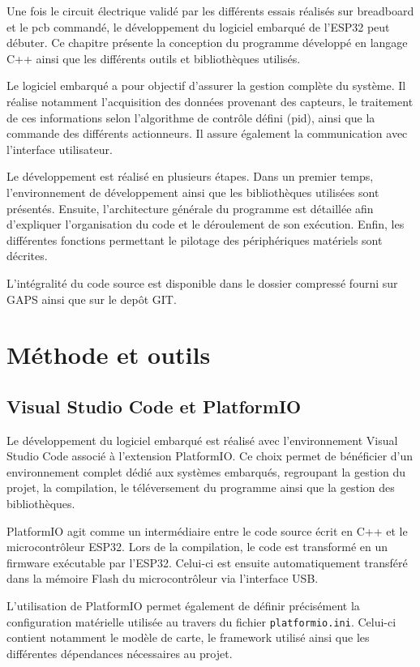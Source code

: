 
Une fois le circuit électrique validé par les différents essais réalisés sur breadboard et le \acrshort{pcb} commandé, le développement du logiciel embarqué de l'ESP32 peut débuter. Ce chapitre présente la conception du programme développé en langage C++ ainsi que les différents outils et bibliothèques utilisés.

Le logiciel embarqué a pour objectif d'assurer la gestion complète du système. Il réalise notamment l'acquisition des données provenant des capteurs, le traitement de ces informations selon l'algorithme de contrôle défini (\acrshort{pid}), ainsi que la commande des différents actionneurs. Il assure également la communication avec l'interface utilisateur.

Le développement est réalisé en plusieurs étapes. Dans un premier temps, l'environnement de développement ainsi que les bibliothèques utilisées sont présentés. Ensuite, l'architecture générale du programme est détaillée afin d'expliquer l'organisation du code et le déroulement de son exécution. Enfin, les différentes fonctions permettant le pilotage des périphériques matériels sont décrites.

L'intégralité du code source est disponible dans le dossier compressé fourni sur GAPS ainsi que sur le depôt GIT.

\section{Méthode et outils}


\subsection{Visual Studio Code et PlatformIO}

Le développement du logiciel embarqué est réalisé avec l'environnement Visual Studio Code associé à l'extension PlatformIO. Ce choix permet de bénéficier d'un environnement complet dédié aux systèmes embarqués, regroupant la gestion du projet, la compilation, le téléversement du programme ainsi que la gestion des bibliothèques.

PlatformIO agit comme un intermédiaire entre le code source écrit en C++ et le microcontrôleur ESP32. Lors de la compilation, le code est transformé en un firmware exécutable par l'ESP32. Celui-ci est ensuite automatiquement transféré dans la mémoire Flash du microcontrôleur via l'interface USB.

L'utilisation de PlatformIO permet également de définir précisément la configuration matérielle utilisée au travers du fichier \texttt{platformio.ini}. Celui-ci contient notamment le modèle de carte, le framework utilisé ainsi que les différentes dépendances nécessaires au projet.


